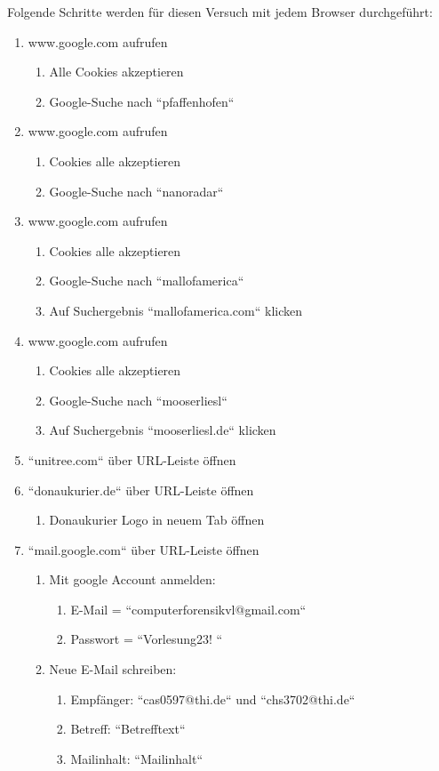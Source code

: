 Folgende Schritte werden für diesen Versuch mit jedem Browser durchgeführt: 
\begin{enumerate}
\item  www.google.com aufrufen
	\begin{enumerate}[label*=\arabic*.]
	\item Alle Cookies akzeptieren 
	\item Google-Suche nach ``pfaffenhofen``
	\end{enumerate}
\item www.google.com aufrufen
	\begin{enumerate}[label*=\arabic*.]
	\item Cookies alle akzeptieren 
	\item Google-Suche nach ``nanoradar``
	\end{enumerate}
\item www.google.com aufrufen
	\begin{enumerate}[label*=\arabic*.]
	\item Cookies alle akzeptieren 
	\item Google-Suche nach ``mallofamerica``
	\item Auf Suchergebnis ``mallofamerica.com`` klicken
	\end{enumerate}
\item www.google.com aufrufen
	\begin{enumerate}[label*=\arabic*.]
	\item Cookies alle akzeptieren 
	\item Google-Suche nach ``mooserliesl``
	\item Auf Suchergebnis ``mooserliesl.de`` klicken
	\end{enumerate}
\item ``unitree.com`` über URL-Leiste öffnen
\item ``donaukurier.de`` über URL-Leiste öffnen
	\begin{enumerate}[label*=\arabic*.]
	\item Donaukurier Logo in neuem Tab öffnen
	\end{enumerate}
\item ``mail.google.com`` über URL-Leiste öffnen
	\begin{enumerate}[label*=\arabic*.]
	\item Mit google Account anmelden: 
			\begin{enumerate}[label*=\arabic*.]
			\item E-Mail = ``computerforensikvl@gmail.com``
			\item Passwort = ``Vorlesung23! ``
			\end{enumerate}
	\item Neue E-Mail schreiben:
			\begin{enumerate}[label*=\arabic*.]
			\item Empfänger: ``cas0597@thi.de`` und ``chs3702@thi.de``
			\item Betreff: ``Betrefftext``
			\item Mailinhalt: ``Mailinhalt``
			\end{enumerate}			
	\end{enumerate}
\end{enumerate}

